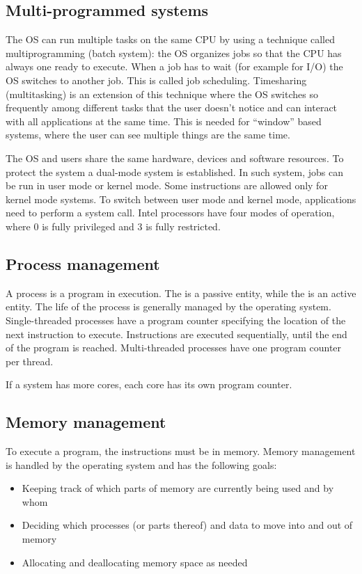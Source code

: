 \subsection{Multi-programmed systems}

The OS can run multiple tasks on the same CPU by using a technique called multiprogramming (batch system): the OS organizes jobs so that the CPU has always one ready to execute. When a job has to wait (for example for I/O) the OS switches to another job. This is called job scheduling. Timesharing (multitasking) is an extension of this technique where the OS switches so frequently among different tasks that the user doesn't notice and can interact with all applications at the same time. This is needed for ``window'' based systems, where the user can see multiple things are the same time.


The OS and users share the same hardware, devices and software resources. To protect the system a dual-mode system is established. In such system, jobs can be run in user mode or kernel mode. Some instructions are allowed only for kernel mode systems. To switch between user mode and kernel mode, applications need to perform a system call. Intel processors have four modes of operation, where 0 is fully privileged and 3 is fully restricted.

\subsection{Process management}

A process is a program in execution. The  is a passive entity, while the  is an active entity. The life of the process is generally managed by the operating system. Single-threaded processes have a program counter specifying the location of the next instruction to execute. Instructions are executed sequentially, until the end of the program is reached. Multi-threaded processes have one program counter per thread.

If a system has more cores, each core has its own program counter.

\subsection{Memory management}

To execute a program, the instructions must be in memory. Memory management is handled by the operating system and has the following goals:
\begin{itemize}
  \item Keeping track of which parts of memory are currently being used and by
  whom
  \item Deciding which processes (or parts thereof) and data to move into and
  out of memory
  \item Allocating and deallocating memory space as needed
\end{itemize}


